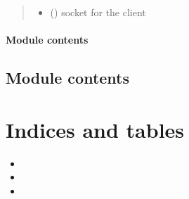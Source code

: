 \documentclass[letterpaper,10pt,english]{sphinxmanual}
\begin{document}
\begin{fulllineitems}
\begin{fulllineitems}
\begin{quote}
\begin{description}
\begin{itemize}
\item {} 
 () \textendash{} socket for the client

\end{itemize}

\end{description}\end{quote}

\end{fulllineitems}


\end{fulllineitems}


\begin{fulllineitems}
\label{\detokenize{bbc1.core.user_message_routing:bbc1.core.user_message_routing.direct_send_to_user}}
\end{fulllineitems}



\subsubsection{Module contents}
\label{\detokenize{bbc1.core:module-bbc1.core}}\label{\detokenize{bbc1.core:module-contents}}

\section{Module contents}
\label{\detokenize{bbc1:module-contents}}\label{\detokenize{bbc1:module-bbc1}}

\chapter{Indices and tables}
\label{\detokenize{index:indices-and-tables}}\begin{itemize}
\item {} 

\item {} 

\item {} 

\end{itemize}
\end{document}
